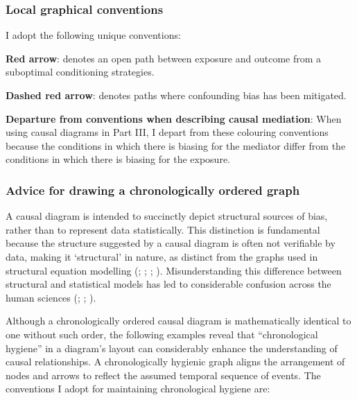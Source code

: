 \documentclass[
  singlecolumn,
  9pt]{article}
\begin{document}
\subsubsection{Local graphical
conventions}\label{local-graphical-conventions}

I adopt the following unique conventions:

\textbf{Red arrow}: denotes an open path between exposure and outcome
from a suboptimal conditioning strategies.

\textbf{Dashed red arrow}: denotes paths where confounding bias has been
mitigated.

\textbf{Departure from conventions when describing causal mediation}:
When using causal diagrams in Part III, I depart from these colouring
conventions because the conditions in which there is biasing for the
mediator differ from the conditions in which there is biasing for the
exposure.

\subsubsection{Advice for drawing a chronologically ordered
graph}\label{advice-for-drawing-a-chronologically-ordered-graph}

A causal diagram is intended to succinctly depict structural sources of
bias, rather than to represent data statistically. This distinction is
fundamental because the structure suggested by a causal diagram is often
not verifiable by data, making it `structural' in nature, as distinct
from the graphs used in structural equation modelling
(;
;
;
). Misunderstanding this
difference between structural and statistical models has led to
considerable confusion across the human sciences
(;
;
).

Although a chronologically ordered causal diagram is mathematically
identical to one without such order, the following examples reveal that
``chronological hygiene'' in a diagram's layout can considerably enhance
the understanding of causal relationships. A chronologically hygienic
graph aligns the arrangement of nodes and arrows to reflect the assumed
temporal sequence of events. The conventions I adopt for maintaining
chronological hygiene are:
\end{document}
